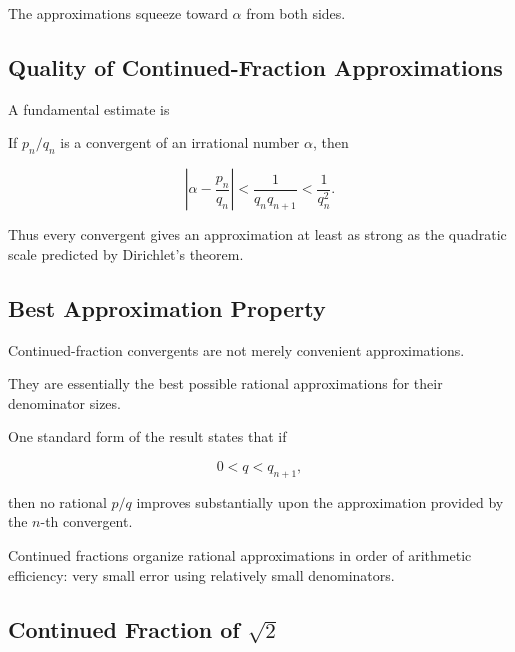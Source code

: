 The approximations squeeze toward \(\alpha\) from both sides.

\subsection{Quality of Continued-Fraction Approximations}
\label{subsec:continued-fraction-quality}

A fundamental estimate is

\begin{theorem}
If \(p_n/q_n\) is a convergent of an irrational number \(\alpha\), then

\[ \boxed{\left|\alpha-\frac{p_n}{q_n}\right|<\frac1{q_nq_{n+1}}<\frac1{q_n^2}.} \]
\end{theorem}

Thus every convergent gives an approximation at least as strong as the
quadratic scale predicted by Dirichlet's theorem.

\subsection{Best Approximation Property}
\label{subsec:continued-fraction-best-approximation}

Continued-fraction convergents are not merely convenient approximations.

They are essentially the best possible rational approximations for their
denominator sizes.

One standard form of the result states that if

\[ 0<q<q_{n+1}, \]

then no rational \(p/q\) improves substantially upon the approximation
provided by the \(n\)-th convergent.

\begin{conceptbox}
Continued fractions organize rational approximations in order of arithmetic
efficiency: very small error using relatively small denominators.
\end{conceptbox}

\subsection{Continued Fraction of \(\sqrt2\)}
\label{subsec:continued-fraction-sqrt2}

